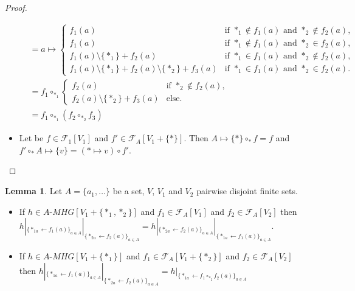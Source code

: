 \documentclass[a4paper]{article}
\theoremstyle{definition}
\newtheorem{lemma}[definition]{Lemma}
\begin{document}
\begin{proof}
\begin{itemize}
\begin{align*}
&= a\mapsto\left\{\begin{array}{cl}
f_1(a)  & \text{if $\ast_1\not\in f_1(a)$ and $\ast_2\not\in f_2(a)$},    \\
f_1(a)  & \text{if $\ast_1\not\in f_1(a)$ and $\ast_2\in f_2(a)$},    \\ 
f_1(a)\setminus\{\ast_1\} + f_2(a)  & \text{if $\ast_1\in f_1(a)$ and $\ast_2\not\in f_2(a)$},    \\ 
f_1(a)\setminus\{\ast_1\} + f_2(a)\setminus\{\ast_2\} + f_3(a)  & \text{if $\ast_1\in f_1(a)$ and $\ast_2\in f_2(a)$}.\end{array}\right. \\
&= f_1\circ_{\ast_1} \left\{\begin{array}{cl}
f_2(a)  & \text{if $\ast_2\not\in f_2(a)$},    \\ 
f_2(a)\setminus\{\ast_2\} + f_3(a)  & \text{else.}\end{array}\right. \\
&= f_1\circ_{\ast_1}(f_2\circ_{\ast_2} f_3)
\end{align*}
\item Let be $f\in \mathcal{F}_1[V_1]$ and $f'\in\mathcal{F}_A[V_1+\{\ast\}]$. Then $A\mapsto\{\ast\}\circ_{\ast} f= f$ and $f'\circ_{\ast} A\mapsto \{v\}= (\ast\mapsto v )\circ f'$.
\end{itemize}
\end{proof}

\begin{lemma}
\label{oppol}
Let $A=\{a_1,\dots\}$ be a set, $V$, $V_1$ and $V_2$ pairwise disjoint finite sets.
\begin{itemize}
\item If $h\in A\text{-}MHG[V_1+\{\ast_1,\ast_2\}]$ and $f_1\in \mathcal{F}_A[V_1]$ and $f_2\in \mathcal{F}_A[V_2]$ then $h|_{\{\ast_{1a}\leftarrow f_1(a)\}_{a\in A}}|_{\{\ast_{2a}\leftarrow f_2(a)\}_{a\in A}} = h|_{\{\ast_{2a}\leftarrow f_2(a)\}_{a\in A}}|_{\{\ast_{1a}\leftarrow f_1(a)\}_{a\in A}}$.
\item If $h\in A\text{-}MHG[V_1+\{\ast_1\}]$ and $f_1\in \mathcal{F}_A[V_1+\{\ast_2\}]$ and $f_2\in \mathcal{F}_A[V_2]$ then $h|_{\{\ast_{1a}\leftarrow f_1(a)\}_{a\in A}}|_{\{\ast_{2a}\leftarrow f_2(a)\}_{a\in A}} = h|_{\{\ast_{1a}\leftarrow f_1\circ_{\ast_2} f_2(a)\}_{a\in A}}$
\end{itemize}
\end{lemma}
\end{document}
